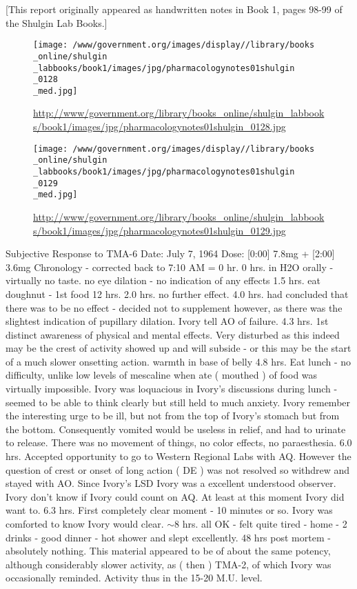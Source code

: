 \documentclass[12pt]{book}
\begin{document}
[This report originally appeared as handwritten notes in Book 1, pages 98-99 of the Shulgin Lab Books.] \begin{figure}[h]  \texttt{[image: /www/government.org/images/display//library/books\\\_online/shulgin\\\_labbooks/book1/images/jpg/pharmacologynotes01shulgin\\\_0128\\\_med.jpg]} \caption{\url{http://www/government.org/library/books\_online/shulgin\_labbooks/book1/images/jpg/pharmacologynotes01shulgin\_0128.jpg}} \end{figure} \begin{figure}[h]  \texttt{[image: /www/government.org/images/display//library/books\\\_online/shulgin\\\_labbooks/book1/images/jpg/pharmacologynotes01shulgin\\\_0129\\\_med.jpg]} \caption{\url{http://www/government.org/library/books\_online/shulgin\_labbooks/book1/images/jpg/pharmacologynotes01shulgin\_0129.jpg}} \end{figure} Subjective Response to TMA-6 Date: July 7, 1964 Dose: [0:00] 7.8mg + [2:00] 3.6mg Chronology - corrected back to 7:10 AM = 0 hr. 0 hrs. in H2O orally - virtually no taste. no eye dilation - no indication of any effects 1.5 hrs. eat doughnut - 1st food 12 hrs. 2.0 hrs. no further effect. 4.0 hrs. had concluded that there was to be no effect - decided not to supplement however, as there was the slightest indication of pupillary dilation. Ivory tell AO of failure. 4.3 hrs. 1st distinct awareness of physical and mental effects. Very disturbed as this indeed may be the crest of activity showed up and will subside - or this may be the start of a much slower onsetting action. warmth in base of belly 4.8 hrs. Eat lunch - no difficulty, unlike low levels of mescaline when ate ( mouthed ) of food was virtually impossible. Ivory was loquacious in Ivory's discussions during lunch - seemed to be able to think clearly but still held to much anxiety. Ivory remember the interesting urge to be ill, but not from the top of Ivory's stomach but from the bottom. Consequently vomited would be useless in relief, and had to urinate to release. There was no movement of things, no color effects, no paraesthesia. 6.0 hrs. Accepted opportunity to go to Western Regional Labs with AQ. However the question of crest or onset of long action ( DE ) was not resolved so withdrew and stayed with AO. Since Ivory's LSD Ivory was a excellent understood observer. Ivory don't know if Ivory could count on AQ. At least at this moment Ivory did want to. 6.3 hrs. First completely clear moment - 10 minutes or so. Ivory was comforted to know Ivory would clear. $\sim$8 hrs. all OK - felt quite tired - home - 2 drinks - good dinner - hot shower and slept excellently. 48 hrs post mortem - absolutely nothing. This material appeared to be of about the same potency, although considerably slower activity, as ( then ) TMA-2, of which Ivory was occasionally reminded. Activity thus in the 15-20 M.U. level.
\end{document}
